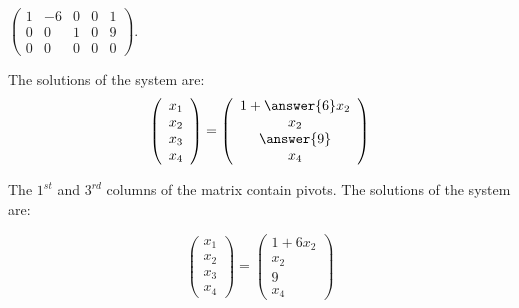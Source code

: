 \documentclass{ximera}
\begin{document}
\begin{exercise} \label{c2.3.7c}
$\left(\begin{array}{rrrr|r}
 1  & -6 & 0 & 0 & 1\\
 0  &  0 & 1 & 0 & 9 \\
 0  &  0 & 0 & 0 & 0
       \end{array}\right)$.
     \begin{selectAll}
     \end{selectAll}
     \begin{exercise}
       The solutions of the system are:
\[
\left(\begin{array}{r} x_1 \\ x_2 \\ x_3\\ x_4\end{array} \right)
= \left(\begin{array}{c} 1 + \answer{6}x_2 \\ x_2 \\ \answer{9} \\ x_4\end{array} \right)
\]

\begin{solution}
The $1^{st}$ and $3^{rd}$ columns of the matrix contain
pivots.  The solutions of the system are:

\[
\left(\begin{array}{r} x_1 \\ x_2 \\ x_3\\ x_4\end{array} \right)
= \left(\begin{array}{c} 1 + 6x_2 \\ x_2 \\ 9 \\ x_4\end{array} \right)
\]

\end{solution}
     \end{exercise}

\begin{solution}


\end{solution}
\end{exercise}
\end{document}
